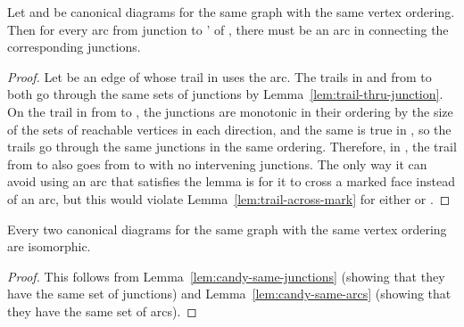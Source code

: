 \documentclass{llncs}
\begin{document}
\begin{lemma}
\label{lem:candy-same-arcs}
Let  and  be canonical diagrams for the same graph  with the same vertex ordering.
Then for every arc from junction  to ' of , there must be an arc in  connecting the corresponding junctions.
\end{lemma}

\begin{proof}
Let  be an edge of  whose trail in  uses the arc.
The trails in  and  from  to  both go through the same sets of junctions by Lemma~\ref{lem:trail-thru-junction}.
On the trail in  from  to , the junctions are monotonic in their ordering
by the size of the sets of reachable vertices in each direction, and the same is true in , so the trails go through the same junctions in the same ordering.
Therefore, in , the trail from  to  also goes from  to  with no intervening junctions.
The only way it can avoid using an arc that satisfies the lemma is for it to cross a marked face instead of an arc, but this would violate Lemma~\ref{lem:trail-across-mark} for either  or .
\end{proof}

\begin{theorem}
Every two canonical diagrams for the same graph  with the same vertex ordering are isomorphic.
\end{theorem}

\begin{proof}
This follows from Lemma~\ref{lem:candy-same-junctions} (showing that they have the same set of junctions) and Lemma~\ref{lem:candy-same-arcs} (showing that they have the same set of arcs).
\end{proof}
\end{document}
